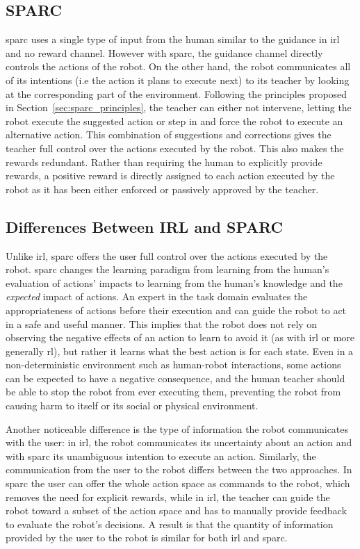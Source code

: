 \subsection{SPARC}

\gls{sparc} uses a single type of input from the human similar to the guidance in \gls{irl} and no reward channel. However with \gls{sparc}, the guidance channel directly controls the actions of the robot. On the other hand, the robot communicates all of its intentions (i.e the action it plans to execute next) to its teacher by looking at the corresponding part of the environment. Following the principles proposed in Section~\ref{sec:sparc_principles}, the teacher can either not intervene, letting the robot execute the suggested action or step in and force the robot to execute an alternative action. This combination of suggestions and corrections gives the teacher full control over the actions executed by the robot. This also makes the rewards redundant. Rather than requiring the human to explicitly provide rewards, a positive reward is directly assigned to each action executed by the robot as it has been either enforced or passively approved by the teacher.

\subsection{Differences Between IRL and SPARC}

Unlike \gls{irl}, \gls{sparc} offers the user full control over the actions executed by the robot. \gls{sparc} changes the learning paradigm from learning from the human's evaluation of actions' impacts to learning from the human's knowledge and the \emph{expected} impact of actions. An expert in the task domain evaluates the appropriateness of actions before their execution and can guide the robot to act in a safe and useful manner. This implies that the robot does not rely on observing the negative effects of an action to learn to avoid it (as with \gls{irl} or more generally \gls{rl}), but rather it learns what the best action is for each state. Even in a non-deterministic environment such as human-robot interactions, some actions can be expected to have a negative consequence, and the human teacher should be able to stop the robot from ever executing them, preventing the robot from causing harm to itself or its social or physical environment. 

Another noticeable difference is the type of information the robot communicates with the user: in \gls{irl}, the robot communicates its uncertainty about an action and with \gls{sparc} its unambiguous intention to execute an action. Similarly, the communication from the user to the  robot differs between the two approaches. In \gls{sparc} the user can offer the whole action space as commands to the robot, which removes the need for explicit rewards, while in \gls{irl}, the teacher can guide the robot toward a subset of the action space and has to manually provide feedback to evaluate the robot's decisions. A result is that the quantity of information provided by the user to the robot is similar for both \gls{irl} and \gls{sparc}. 

